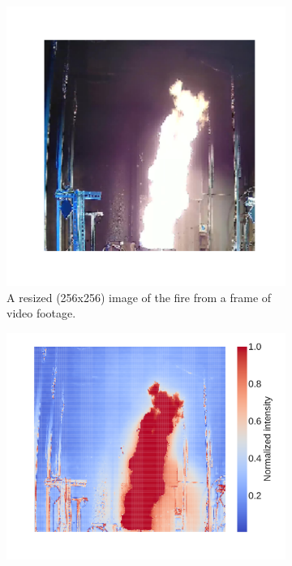 \documentclass{article}
\begin{document}
\begin{figure}[htbp]
  \centering
  \begin{subfigure}[t]{.35\textwidth}
      \centering
      \includegraphics[width=\textwidth,keepaspectratio]{figures/fire_image.pdf}
      \caption{A resized (256x256) image of the fire from a frame of video footage.}
      \label{fig:fire_image}
  \end{subfigure}
  \begin{subfigure}[t]{.4\textwidth}
      \centering
      \includegraphics[width=\textwidth ,keepaspectratio]{figures/brightness_heatmap.pdf}

\end{subfigure}
\end{figure}
\end{document}
